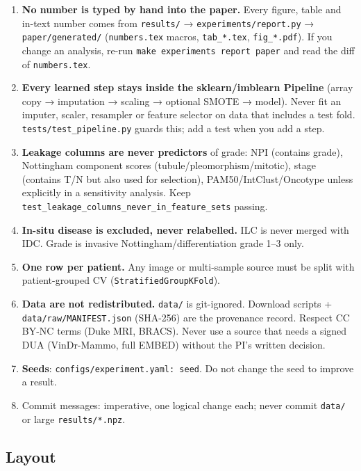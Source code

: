 \documentclass[
  10pt,
]{article}
\providecommand{\tightlist}{%
  \setlength{\itemsep}{0pt}\setlength{\parskip}{0pt}}
\begin{document}
\begin{enumerate}
\def\labelenumi{\arabic{enumi}.}
\tightlist
\item
  \textbf{No number is typed by hand into the paper.} Every figure,
  table and in-text number comes from \texttt{results/} →
  \texttt{experiments/report.py} → \texttt{paper/generated/}
  (\texttt{numbers.tex} macros, \texttt{tab\_*.tex},
  \texttt{fig\_*.pdf}). If you change an analysis, re-run
  \texttt{make\ experiments\ report\ paper} and read the diff of
  \texttt{numbers.tex}.
\item
  \textbf{Every learned step stays inside the sklearn/imblearn Pipeline}
  (array copy → imputation → scaling → optional SMOTE → model). Never
  fit an imputer, scaler, resampler or feature selector on data that
  includes a test fold. \texttt{tests/test\_pipeline.py} guards this;
  add a test when you add a step.
\item
  \textbf{Leakage columns are never predictors} of grade: NPI (contains
  grade), Nottingham component scores (tubule/pleomorphism/mitotic),
  stage (contains T/N but also used for selection),
  PAM50/IntClust/Oncotype unless explicitly in a sensitivity analysis.
  Keep \texttt{test\_leakage\_columns\_never\_in\_feature\_sets}
  passing.
\item
  \textbf{In-situ disease is excluded, never relabelled.} ILC is never
  merged with IDC. Grade is invasive Nottingham/differentiation grade
  1--3 only.
\item
  \textbf{One row per patient.} Any image or multi-sample source must be
  split with patient-grouped CV (\texttt{StratifiedGroupKFold}).
\item
  \textbf{Data are not redistributed.} \texttt{data/} is git-ignored.
  Download scripts + \texttt{data/raw/MANIFEST.json} (SHA-256) are the
  provenance record. Respect CC BY-NC terms (Duke MRI, BRACS). Never use
  a source that needs a signed DUA (VinDr-Mammo, full EMBED) without the
  PI's written decision.
\item
  \textbf{Seeds}: \texttt{configs/experiment.yaml:\ seed}. Do not change
  the seed to improve a result.
\item
  Commit messages: imperative, one logical change each; never commit
  \texttt{data/} or large \texttt{results/*.npz}.
\end{enumerate}

\hypertarget{layout}{%
\subsection{Layout}\label{layout}}
\end{document}
